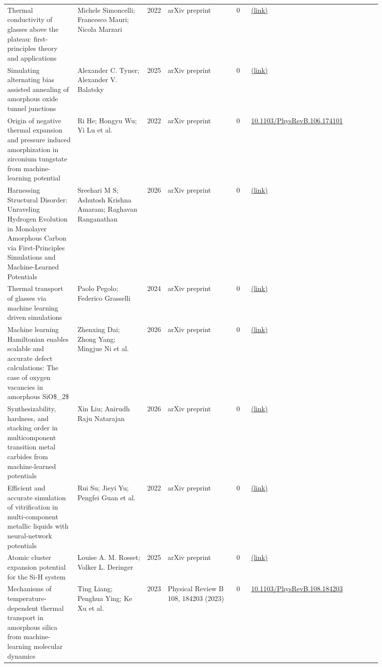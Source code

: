 \documentclass[10pt,a4paper]{article}
\begin{document}
{\begin{longtable}{p{0.192\linewidth}p{0.192\linewidth}p{0.043\linewidth}p{0.192\linewidth}p{0.043\linewidth}p{0.132\linewidth}p{0.096\linewidth}}
Thermal conductivity of glasses above the plateau: first-principles theory and applications & Michele Simoncelli; Francesco Mauri; Nicola Marzari & 2022 & arXiv preprint & 0 & \href{http://arxiv.org/abs/2209.11201v1}{(link)} &  \\
Simulating alternating bias assisted annealing of amorphous oxide tunnel junctions & Alexander C. Tyner; Alexander V. Balatsky & 2025 & arXiv preprint & 0 & \href{http://arxiv.org/abs/2512.18420v1}{(link)} &  \\
Origin of negative thermal expansion and pressure induced amorphization in zirconium tungstate from machine-learning potential & Ri He; Hongyu Wu; Yi Lu et al. & 2022 & arXiv preprint & 0 & \href{https://doi.org/10.1103/PhysRevB.106.174101}{10.1103/PhysRevB.106.174101} &  \\
Harnessing Structural Disorder: Unraveling Hydrogen Evolution in Monolayer Amorphous Carbon via First-Principles Simulations and Machine-Learned Potentials & Sreehari M S; Ashutosh Krishna Amaram; Raghavan Ranganathan & 2026 & arXiv preprint & 0 & \href{http://arxiv.org/abs/2605.07670v1}{(link)} &  \\
Thermal transport of glasses via machine learning driven simulations & Paolo Pegolo; Federico Grasselli & 2024 & arXiv preprint & 0 & \href{http://arxiv.org/abs/2402.06479v1}{(link)} &  \\
Machine learning Hamiltonian enables scalable and accurate defect calculations: The case of oxygen vacancies in amorphous SiO\$\_2\$ & Zhenxing Dai; Zhong Yang; Mingjue Ni et al. & 2026 & arXiv preprint & 0 & \href{http://arxiv.org/abs/2604.07197v1}{(link)} &  \\
Synthesizability, hardness, and stacking order in multicomponent transition metal carbides from machine-learned potentials & Xin Liu; Anirudh Raju Natarajan & 2026 & arXiv preprint & 0 & \href{http://arxiv.org/abs/2605.29482v1}{(link)} &  \\
Efficient and accurate simulation of vitrification in multi-component metallic liquids with neural-network potentials & Rui Su; Jieyi Yu; Pengfei Guan et al. & 2022 & arXiv preprint & 0 & \href{http://arxiv.org/abs/2211.03350v3}{(link)} &  \\
Atomic cluster expansion potential for the Si-H system & Louise A. M. Rosset; Volker L. Deringer & 2025 & arXiv preprint & 0 & \href{http://arxiv.org/abs/2510.15633v1}{(link)} &  \\
Mechanisms of temperature-dependent thermal transport in amorphous silica from machine-learning molecular dynamics & Ting Liang; Penghua Ying; Ke Xu et al. & 2023 & Physical Review B 108, 184203 (2023) & 0 & \href{https://doi.org/10.1103/PhysRevB.108.184203}{10.1103/PhysRevB.108.184203} &  \\

\end{longtable}}
\end{document}
